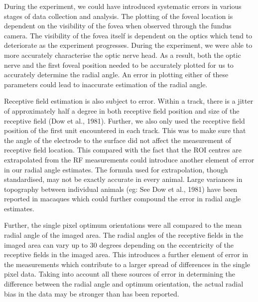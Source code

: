 		During the experiment, we could have introduced systematic errors in various stages of data collection and analysis. The plotting of the foveal location is dependent on the visibility of the fovea when observed through the fundus camera. The visibility of the fovea itself is dependent on the optics which tend to deteriorate as the experiment progresses. During the experiment, we were able to more accurately characterise the optic nerve head. As a result, both the optic nerve and the first foveal position needed to be accurately plotted for us to accurately determine the radial angle. An error in plotting either of these parameters could lead to inaccurate estimation of the radial angle.
		
		Receptive field estimation is also subject to error. Within a track, there is a jitter of approximately half a degree in both receptive field position and size of the receptive field (Dow et al., 1981). Further, we also only used the receptive field position of the first unit encountered in each track. This was to make sure that the angle of the electrode to the surface did not affect the measurement of receptive field location. This compared with the fact that the ROI centres are extrapolated from the RF measurements could introduce another element of error in our radial angle estimates. The formula used for extrapolation, though standardised, may not be exactly accurate in every animal. Large variances in topography between individual animals (eg: See Dow et al., 1981) have been reported in macaques which could further compound the error in radial angle estimates.
		
		Further, the single pixel optimum orientations were all compared to the mean radial angle of the imaged area. The radial angles of the receptive fields in the imaged area can vary up to 30 degrees depending on the eccentricity of the receptive fields in the imaged area. This introduces a further element of error in the measurements which contribute to a larger spread of differences in the single pixel data. Taking into account all these sources of error in determining the difference between the radial angle and optimum orientation, the actual radial bias in the data may be stronger than has been reported.
		
